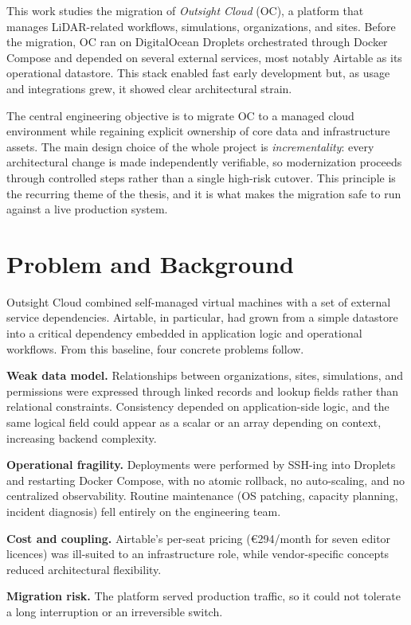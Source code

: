\documentclass[conference]{IEEEtran}
\begin{document}
This work studies the migration of \emph{Outsight Cloud} (OC), a platform
that manages LiDAR-related workflows, simulations, organizations, and
sites. Before the migration, OC ran on DigitalOcean Droplets orchestrated
through Docker Compose and depended on several external services, most
notably Airtable as its operational datastore. This stack enabled fast
early development but, as usage and integrations grew, it showed clear
architectural strain.

The central engineering objective is to migrate OC to a managed cloud
environment while regaining explicit ownership of core data and
infrastructure assets. The main design choice of the whole project is
\emph{incrementality}: every architectural change is made independently
verifiable, so modernization proceeds through controlled steps rather than
a single high-risk cutover. This principle is the recurring theme of the
thesis, and it is what makes the migration safe to run against a live
production system.

\section{Problem and Background}
Outsight Cloud combined self-managed virtual machines with a set of
external service dependencies. Airtable, in particular, had grown from a
simple datastore into a critical dependency embedded in application logic
and operational workflows. From this baseline, four concrete problems
follow.

\textbf{Weak data model.} Relationships between organizations, sites,
simulations, and permissions were expressed through linked records and
lookup fields rather than relational constraints. Consistency depended on
application-side logic, and the same logical field could appear as a scalar
or an array depending on context, increasing backend complexity.

\textbf{Operational fragility.} Deployments were performed by SSH-ing into
Droplets and restarting Docker Compose, with no atomic rollback, no
auto-scaling, and no centralized observability. Routine maintenance
(OS patching, capacity planning, incident diagnosis) fell entirely on the
engineering team.

\textbf{Cost and coupling.} Airtable's per-seat pricing (\euro294/month for
seven editor licences) was ill-suited to an infrastructure role, while
vendor-specific concepts reduced architectural flexibility.

\textbf{Migration risk.} The platform served production traffic, so it
could not tolerate a long interruption or an irreversible switch.
\end{document}

